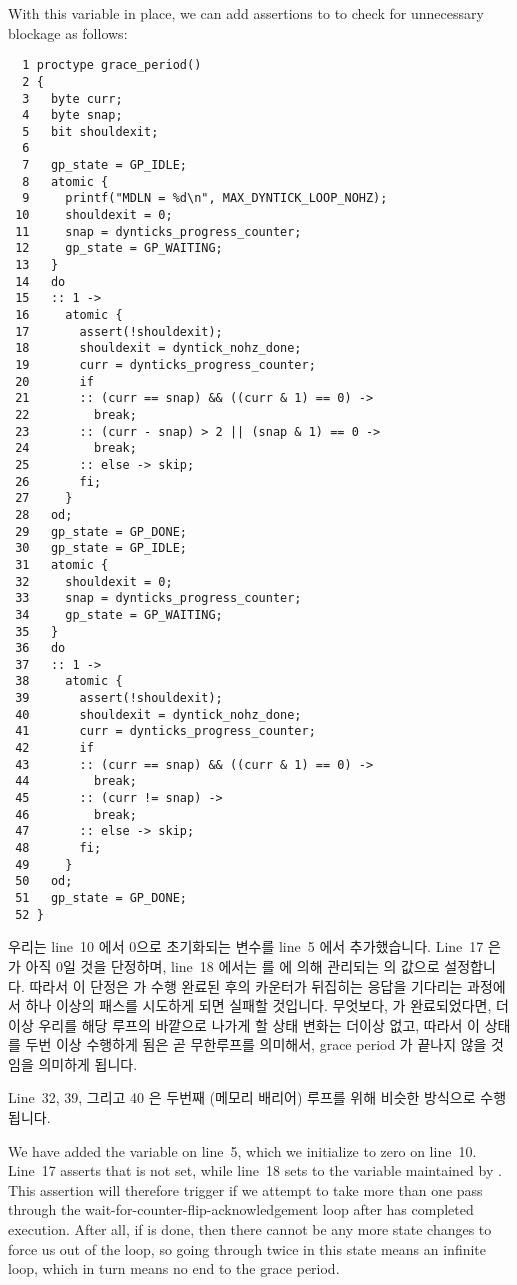 With this variable in place, we can add assertions to
 to check for unnecessary blockage
as follows:
\fi

{ \scriptsize
\begin{verbatim}
  1 proctype grace_period()
  2 {
  3   byte curr;
  4   byte snap;
  5   bit shouldexit;
  6
  7   gp_state = GP_IDLE;
  8   atomic {
  9     printf("MDLN = %d\n", MAX_DYNTICK_LOOP_NOHZ);
 10     shouldexit = 0;
 11     snap = dynticks_progress_counter;
 12     gp_state = GP_WAITING;
 13   }
 14   do
 15   :: 1 ->
 16     atomic {
 17       assert(!shouldexit);
 18       shouldexit = dyntick_nohz_done;
 19       curr = dynticks_progress_counter;
 20       if
 21       :: (curr == snap) && ((curr & 1) == 0) ->
 22         break;
 23       :: (curr - snap) > 2 || (snap & 1) == 0 ->
 24         break;
 25       :: else -> skip;
 26       fi;
 27     }
 28   od;
 29   gp_state = GP_DONE;
 30   gp_state = GP_IDLE;
 31   atomic {
 32     shouldexit = 0;
 33     snap = dynticks_progress_counter;
 34     gp_state = GP_WAITING;
 35   }
 36   do
 37   :: 1 ->
 38     atomic {
 39       assert(!shouldexit);
 40       shouldexit = dyntick_nohz_done;
 41       curr = dynticks_progress_counter;
 42       if
 43       :: (curr == snap) && ((curr & 1) == 0) ->
 44         break;
 45       :: (curr != snap) ->
 46         break;
 47       :: else -> skip;
 48       fi;
 49     }
 50   od;
 51   gp_state = GP_DONE;
 52 }
\end{verbatim}
}

우리는 line~10 에서 0으로 초기화되는  변수를 line~5 에서
추가했습니다.
Line~17 은  가 아직 0일 것을 단정하며, line~18 에서는
 를  에 의해 관리되는 
의 값으로 설정합니다.
따라서 이 단정은  가 수행 완료된 후의 카운터가 뒤집히는
응답을 기다리는 과정에서 하나 이상의 패스를 시도하게 되면 실패할 것입니다.
무엇보다,  가 완료되었다면, 더이상 우리를 해당 루프의
바깥으로 나가게 할 상태 변화는 더이상 없고, 따라서 이 상태를 두번 이상 수행하게
됨은 곧 무한루프를 의미해서, grace period 가 끝나지 않을 것임을 의미하게
됩니다.

Line~32, 39, 그리고 40 은 두번째 (메모리 배리어) 루프를 위해 비슷한 방식으로
수행됩니다.
\iffalse

We have added the  variable on line~5,
which we initialize to zero on line~10.
Line~17 asserts that  is not set, while
line~18 sets  to the 
variable maintained by .
This assertion will therefore trigger if we attempt to take more than
one pass through the wait-for-counter-flip-acknowledgement
loop after  has completed
execution.
After all, if  is done, then there cannot be
any more state changes to force us out of the loop, so going through twice
in this state means an infinite loop, which in turn means no end to the
grace period.

